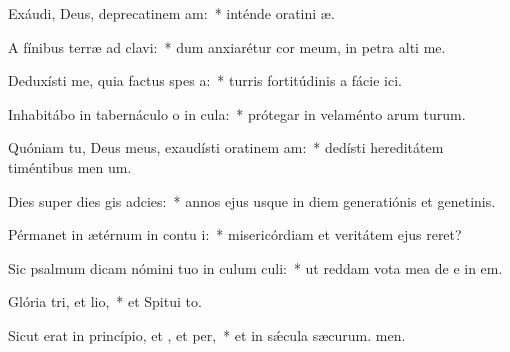\item Exáudi, Deus, deprecatinem am:~* inténde oratini æ.
\item A fínibus terræ ad  clavi:~* dum anxiarétur cor meum, in petra alti me.
\item Deduxísti me, quia factus  spes a:~* turris fortitúdinis a fácie ici.
\item Inhabitábo in tabernáculo o in cula:~* prótegar in velaménto arum turum.
\item Quóniam tu, Deus meus, exaudísti oratinem am:~* dedísti hereditátem timéntibus men um.
\item Dies super dies gis adcies:~* annos ejus usque in diem generatiónis et genetinis.
\item Pérmanet in ætérnum in contu i:~* misericórdiam et veritátem ejus  reret?
\item Sic psalmum dicam nómini tuo in culum culi:~* ut reddam vota mea de e in em.
\item Glória tri, et lio,~* et Spitui to.
\item Sicut erat in princípio, et , et per,~* et in sǽcula sæcurum. men.
